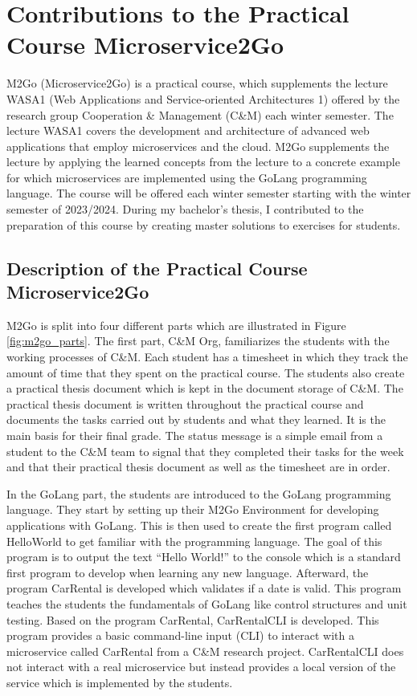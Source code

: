 \chapter{Contributions to the Practical Course Microservice2Go}

M2Go (Microservice2Go) is a practical course,
which supplements the lecture WASA1 (Web Applications and Service-oriented Architectures 1)
offered by the research group Cooperation \& Management (C\&M) each winter semester.
The lecture WASA1 covers the development and architecture of advanced web applications
that employ microservices and the cloud. M2Go supplements the lecture by applying the learned concepts
from the lecture to a concrete example for which microservices are
implemented using the GoLang programming language. The course will be offered each winter semester
starting with the winter semester of 2023/2024. During my bachelor's thesis, I contributed
to the preparation of this course by creating master solutions to exercises for students.


\section{Description of the Practical Course Microservice2Go}

M2Go is split into four different parts which are illustrated in Figure \ref{fig:m2go_parts}.
The first part, C\&M Org, familiarizes the students with the working processes of C\&M.
Each student has a timesheet in which they track the amount of time that they spent on the practical course.
The students also create a practical thesis document which is kept in the document storage of C\&M.
The practical thesis document is written throughout the practical course and documents the tasks
carried out by students and what they learned. It is the main basis for their final grade.
The status message is a simple email from a student to the C\&M team to signal that they completed
their tasks for the week and that their practical thesis document as well as the timesheet are in order.

In the GoLang part, the students are introduced to the GoLang programming language.
They start by setting up their M2Go Environment for developing applications with GoLang.
This is then used to create the first program called HelloWorld to get familiar with the programming language.
The goal of this program is to output the text ``Hello World!'' to the console which is a standard first program
to develop when learning any new language.
Afterward, the program CarRental is developed which validates if a date is valid.
This program teaches the students the fundamentals of GoLang like control structures
and unit testing. Based on the program CarRental, CarRentalCLI is developed.
This program provides a basic command-line input (CLI) to interact with a microservice
called CarRental from a C\&M research project. CarRentalCLI does not interact with a real
microservice but instead provides a local version of the service which is implemented by the students.

